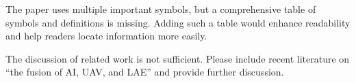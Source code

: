 \begin{revcomment}
	The paper uses multiple important symbols, but a comprehensive table of symbols and definitions is missing. Adding such a table would enhance readability and help readers locate information more easily.
\end{revcomment}
\begin{revresponse}
	
\end{revresponse}

\begin{revcomment}
	The discussion of related work is not sufficient. Please include recent literature on ``the fusion of AI, UAV, and LAE'' and provide further discussion.
\end{revcomment}
\begin{revresponse}
	
\end{revresponse}

